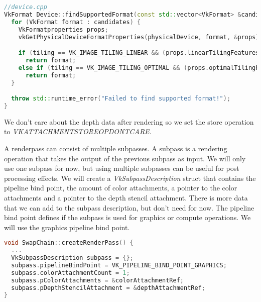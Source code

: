 \documentclass[12pt]{report} \usepackage{preamble}
\begin{document}
\begin{lstlisting}[language=C++]
//device.cpp
VkFormat Device::findSupportedFormat(const std::vector<VkFormat> &candidates, VkImageTiling tiling, VkFormatFeatureFlags features) {
  for (VkFormat format : candidates) {
    VkFormatproperties props;
    vkGetPhysicalDeviceFormatProperties(physicalDevice, format, &props);

    if (tiling == VK_IMAGE_TILING_LINEAR && (props.linearTilingFeatures & features) == features)
      return format;
    else if (tiling == VK_IMAGE_TILING_OPTIMAL && (props.optimalTilingFeatures & features) == features)
      return format;
  }

  throw std::runtime_error("Failed to find supported format!");
}
\end{lstlisting}

We don't care about the depth data after rendering so we set the store operation to
\textit{VK\textunderscore ATTACHMENT\textunderscore STORE\textunderscore OP\textunderscore DONT\textunderscore CARE}.

A renderpass can consist of multiple subpasses. A subpass is a rendering operation that takes the output of the previous
subpass as input. We will only use one subpass for now, but using multiple subpasses can be useful for post processing
effects. We will create a \textit{VkSubpassDescription} struct that contains the pipeline bind point, the amount of color
attachments, a pointer to the color attachments and a pointer to the depth stencil attachment. There is more data that
we can add to the subpass description, but don't need for now. The pipeline bind point defines if the subpass is used
for graphics or compute operations. We will use the graphics pipeline bind point.

\begin{lstlisting}[language=C++]
void SwapChain::createRenderPass() {
  ...
  VkSubpassDescription subpass = {};
  subpass.pipelineBindPoint = VK_PIPELINE_BIND_POINT_GRAPHICS;
  subpass.colorAttachmentCount = 1;
  subpass.pColorAttachments = &colorAttachmentRef;
  subpass.pDepthStencilAttachment = &depthAttachmentRef;
}
\end{lstlisting}
\end{document}
